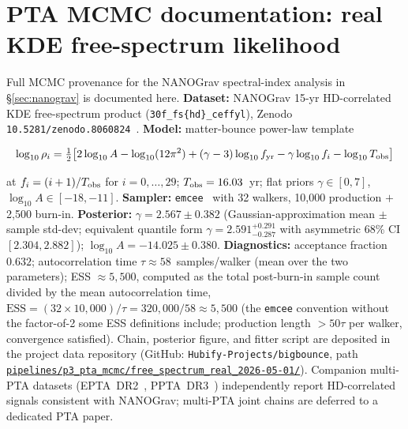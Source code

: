 \documentclass[aps,prd,twocolumn,superscriptaddress,showpacs,preprintnumbers,nofootinbib,longbibliography,floatfix]{revtex4-2}
\newcommand{\repoBase}{https://github.com/Hubify-Projects/bigbounce/blob/main}
\newcommand{\artifact}[1]{\href{\repoBase/#1}{\nolinkurl{#1}}}
\begin{document}
\section{PTA MCMC documentation: real KDE free-spectrum likelihood}\label{app:pta_mcmc}

Full MCMC provenance for the NANOGrav spectral-index analysis in \S\ref{sec:nanograv} is documented here. \textbf{Dataset:} NANOGrav 15-yr HD-correlated KDE free-spectrum product (\texttt{30f\_fs\{hd\}\_ceffyl}), Zenodo \texttt{10.5281/zenodo.8060824}~\cite{NANOGrav2023}. \textbf{Model:} matter-bounce power-law template
\begin{widetext}
\begin{equation}
\log_{10}\rho_i = \tfrac{1}{2}\!\left[2\log_{10}A - \log_{10}(12\pi^2) + (\gamma-3)\log_{10}f_{\rm yr} - \gamma\log_{10}f_i - \log_{10}T_{\rm obs}\right]
\end{equation}
\end{widetext}
at $f_i = (i+1)/T_{\rm obs}$ for $i = 0,\dots,29$; $T_{\rm obs} = 16.03$~yr; flat priors $\gamma \in [0,7]$, $\log_{10}A \in [-18,-11]$. \textbf{Sampler:} \texttt{emcee}~\cite{Foreman-Mackey2013} with 32 walkers, 10{,}000 production $+$ 2{,}500 burn-in. \textbf{Posterior:} $\gamma = 2.567 \pm 0.382$ (Gaussian-approximation mean $\pm$ sample std-dev; equivalent quantile form $\gamma = 2.591^{+0.291}_{-0.287}$ with asymmetric 68\% CI $[2.304, 2.882]$); $\log_{10}A = -14.025 \pm 0.380$. \textbf{Diagnostics:} acceptance fraction $0.632$; autocorrelation time $\tau \approx 58$~samples/walker (mean over the two parameters); ESS $\approx 5{,}500$, computed as the total post-burn-in sample count divided by the mean autocorrelation time, $\mathrm{ESS} = (32 \times 10{,}000)/\tau = 320{,}000/58 \approx 5{,}500$ (the \texttt{emcee} convention without the factor-of-2 some ESS definitions include; production length $> 50\tau$ per walker, convergence satisfied). Chain, posterior figure, and fitter script are deposited in the project data repository (GitHub: \texttt{Hubify-Projects/bigbounce}, path \artifact{pipelines/p3_pta_mcmc/free_spectrum_real_2026-05-01/}). Companion multi-PTA datasets (EPTA~DR2~\cite{EPTA2023}, PPTA~DR3~\cite{PPTA2023}) independently report HD-correlated signals consistent with NANOGrav; multi-PTA joint chains are deferred to a dedicated PTA paper.
\end{document}
